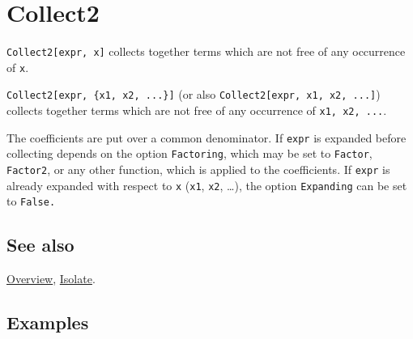 \documentclass[../FeynCalcManual.tex]{subfiles}
\begin{document}
\hypertarget{collect2}{
\section{Collect2}\label{collect2}}

\texttt{Collect2[\allowbreak{}expr,\ \allowbreak{}x]} collects together
terms which are not free of any occurrence of \texttt{x}.

\texttt{Collect2[\allowbreak{}expr,\ \allowbreak{}\{\allowbreak{}x1,\ \allowbreak{}x2,\ \allowbreak{}...\}]}
(or also
\texttt{Collect2[\allowbreak{}expr,\ \allowbreak{}x1,\ \allowbreak{}x2,\ \allowbreak{}...]})
collects together terms which are not free of any occurrence of
\texttt{x1,\ \allowbreak{}x2,\ \allowbreak{}...}.

The coefficients are put over a common denominator. If \texttt{expr} is
expanded before collecting depends on the option \texttt{Factoring},
which may be set to \texttt{Factor}, \texttt{Factor2}, or any other
function, which is applied to the coefficients. If \texttt{expr} is
already expanded with respect to \texttt{x} (\texttt{x1}, \texttt{x2},
\ldots), the option \texttt{Expanding} can be set to \texttt{False.}

\subsection{See also}

\hyperlink{toc}{Overview}, \hyperlink{isolate}{Isolate}.

\subsection{Examples}

\begin{Shaded}
\begin{Highlighting}[]
\OperatorTok{[}\ExtensionTok{=}  \SpecialCharTok{+}   \SpecialCharTok{+} \SpecialCharTok{\^{}} \OperatorTok{[}\OperatorTok{]} \SpecialCharTok{{-}}  \OperatorTok{[}\OperatorTok{]} \SpecialCharTok{+} \SpecialCharTok{/} \SpecialCharTok{{-}} \SpecialCharTok{/}\OperatorTok{,} \OperatorTok{]}
\end{Highlighting}
\end{Shaded}
\end{document}
